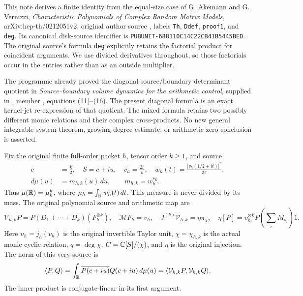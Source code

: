 \documentclass[11pt]{article}
\begin{document}
This note derives a finite identity from the equal-size case of G. Akemann
and G. Vernizzi, \emph{Characteristic Polynomials of Complex Random Matrix
Models}, arXiv:hep-th/0212051v2, original author source
, labels \texttt{Th}, \texttt{Ddef},
\texttt{proof1}, and \texttt{deg}. Its canonical disk-source identifier is
\texttt{PUBUNIT-688110C14C22CB41B5445BED}. The original source's formula
\texttt{deg} explicitly retains the factorial product for coincident
arguments. We use divided derivatives throughout, so those factorials
occur in the entries rather than as an outside multiplier.

The programme already proved the diagonal source/boundary determinant
quotient in \emph{Source--boundary volume dynamics for the arithmetic
control}, supplied in ,
member , equations (11)--(16).
The present diagonal formula is an exact kernel-jet re-expression of
that quotient. The mixed formula retains two possibly different monic
relations and their complex cross-products. No new general integrable
system theorem, growing-degree estimate, or arithmetic-zero conclusion
is asserted.

Fix the original finite full-order packet \(h\), tensor order \(k\geq1\),
and source
\begin{equation}\label{mrfinite:eq:source}
\begin{aligned}
 c&=\frac{k}{2},\quad S=c+iu,\quad v_h=\frac{2\xi}{h},\quad
 w_h(t)=\frac{|v_h(1/2+it)|^2}{2\pi},\\
 d\mu(u)&=m_{h,k}(u)\,du,\qquad m_{h,k}=w_h^{*k}.
\end{aligned}
\end{equation}
Thus \(\mu(\mathbb R)=\mu_h^k\), where \(\mu_h=\int_\mathbb R w_h(t)\,dt\).
This measure is never divided by its mass.
The original polynomial source and arithmetic map are
\begin{equation}\label{mrfinite:eq:original-maps}
 \mathcal V_{h,k}P
   =P(D_1+\cdots+D_k)(F_h^{\otimes k}),\quad
 \mathcal M F_h=v_h,\quad
 J^{(k)}\mathcal V_{h,k}=\eta\pi_\chi,
 \quad
 \eta[P]=\upsilon_h^{\otimes k}
             P\!\left(\sum_iM_{s_i}\right)1.
\end{equation}
Here \(\upsilon_h=j_h(v_h)\) is the original invertible Taylor unit,
\(\chi=\chi_{h,k}\) is the actual monic cyclic relation,
\(q=\deg\chi\), \(C=\mathbb C[S]/(\chi)\), and \(\eta\) is the original
injection. The norm of this very source is
\begin{equation}\label{mrfinite:eq:inner}
 \langle P,Q\rangle
 =\int_\mathbb R\overline{P(c+iu)}Q(c+iu)\,d\mu(u)
 =\langle\mathcal V_{h,k}P,\mathcal V_{h,k}Q\rangle.
\end{equation}
The inner product is conjugate-linear in its first argument.
\end{document}
